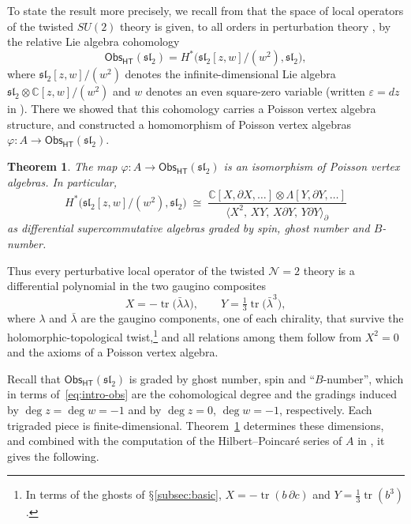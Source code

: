 \documentclass[11pt]{amsart}
\numberwithin{equation}{section}
\renewcommand{\S}{\mbox{$\mathsection$}}
\newtheorem{theorem}{Theorem}[section]
\theoremstyle{definition}
\theoremstyle{remark}
\newcommand{\C}{\mathbb{C}}
\newcommand{\sltwo}{\mathfrak{sl}_2}
\newcommand{\dd}{\partial}
\newcommand{\Obs}{\mathsf{Obs}_{\mathsf{HT}}}
\begin{document}
To state the result more precisely, we recall from \cite{Kha26} that the space of local operators of the twisted $SU(2)$ theory is given, to all orders in perturbation theory \cite{ESW22,BG25}, by the relative Lie algebra cohomology
\begin{equation}\label{eq:intro-obs}
\Obs(\sltwo)
=H^*\bigl(\sltwo[z,w]/(w^2),\sltwo\bigr),
\end{equation}
where $\sltwo[z,w]/(w^2)$ denotes the infinite-dimensional Lie algebra $\sltwo\otimes\C[z,w]/(w^2)$ and $w$ denotes an even square-zero variable (written $\varepsilon=dz$ in \cite{Kha26}). There we showed that this cohomology carries a Poisson vertex algebra structure, and constructed a homomorphism of Poisson vertex algebras $\varphi: A \to \Obs(\sltwo)$.

\begin{theorem}\label{thm:main}
The map $\varphi:A\to\Obs(\sltwo)$ is an isomorphism of Poisson vertex algebras. In particular,
\begin{equation}\label{eq:main-presentation}
H^*\bigl(\sltwo[z,w]/(w^2),\sltwo\bigr)\;\cong\;
\frac{\C[X,\dd X,\ldots]\otimes\Lambda[Y,\dd Y,\ldots]}{\langle X^2,\,XY,\,X\dd Y,\,Y\dd Y\rangle_\dd}
\end{equation}
as differential supercommutative algebras graded by spin, ghost number and $B$-number.
\end{theorem}

Thus every perturbative local operator of the twisted $\mathcal N=2$ theory is a differential polynomial in the two gaugino composites
\begin{equation}\label{eq:gaugino}
X=-\operatorname{tr}\bigl(\bar\lambda\lambda\bigr),\qquad
Y=\tfrac13\operatorname{tr}\bigl(\bar\lambda^3\bigr),
\end{equation}
where $\lambda$ and $\bar\lambda$ are the gaugino components, one of each chirality, that survive the holomorphic-topological twist,\footnote{In terms of the ghosts of \S\ref{subsec:basic}, $X=-\operatorname{tr}(b\,\dd c)$ and $Y=\frac13\operatorname{tr}(b^3)$.} and all relations among them follow from $X^2=0$ and the axioms of a Poisson vertex algebra.

Recall that $\Obs(\sltwo)$ is graded by ghost number, spin and ``$B$-number'', which in terms of~\eqref{eq:intro-obs} are the cohomological degree and the gradings induced by $\deg z=\deg w=-1$ and by $\deg z=0$, $\deg w=-1$, respectively. Each trigraded piece is finite-dimensional. Theorem~\ref{thm:main} determines these dimensions, and combined with the computation of the Hilbert--Poincar\'e series of $A$ in \cite[(2.65)]{Kha26}, it gives the following.
\end{document}
